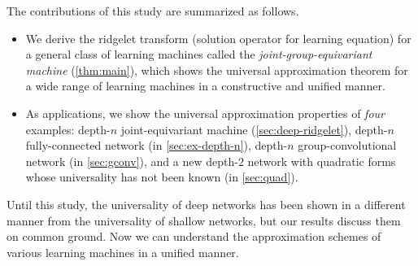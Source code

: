 The contributions of this study are summarized as follows.
\begin{itemize}
    \item We derive the ridgelet transform (solution operator for learning equation) for a general class of learning machines called the \emph{joint-group-equivariant machine} (\cref{thm:main}), 
    which shows the universal approximation theorem for a wide range of learning machines in a constructive and unified manner.
    \item As applications, we show the universal approximation properties of \emph{four} examples: depth-$n$ joint-equivariant machine (\cref{sec:deep-ridgelet}), depth-$n$ fully-connected network (in \cref{sec:ex-depth-n}), depth-$n$ group-convolutional network (in \cref{sec:gconv}), and a new depth-$2$ network with quadratic forms whose universality has not been known (in \cref{sec:quad}).
\end{itemize}
    Until this study, the universality of deep networks has been shown in a different manner from the universality of shallow networks, but our results discuss them on common ground. Now we can understand the approximation schemes of various learning machines in a unified manner.




